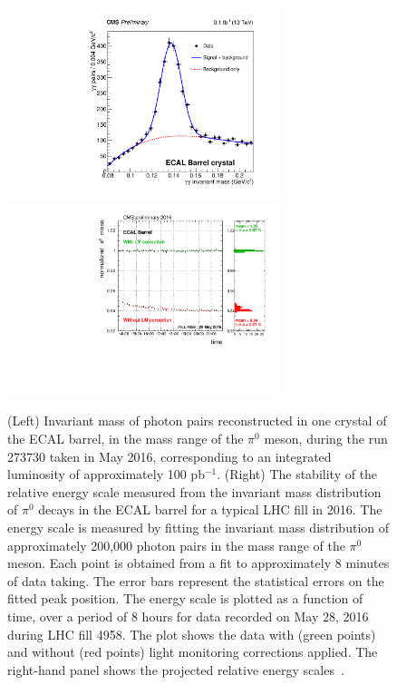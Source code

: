 \begin{figure}[bht]
\begin{center}
\includegraphics[height=5.6cm]{figs/cms/Fit_EB_cry.pdf}
\includegraphics[height=5.6cm]{figs/cms/pi0_EB_plus_1.pdf}
\end{center}
\caption{\label{fig:etaEB}
 (Left) Invariant mass of photon
pairs reconstructed in one crystal of the ECAL barrel, in
the mass range of the $\pi^0$ meson, during the run 273730 taken in May 2016,
corresponding to an integrated luminosity of approximately 100
pb$^{-1}$. (Right) The stability of the relative energy scale measured from the invariant mass distribution of
$\pi^0$ decays in the ECAL barrel for a typical LHC fill in 2016. The energy scale is measured by fitting
the invariant mass distribution of approximately 200,000 photon pairs
in the mass range of the $\pi^0$ meson. Each point is obtained from a fit
to approximately 8 minutes of data taking. The error bars represent
the statistical errors on the fitted peak position. The energy scale
is plotted as a function of time, over a period of 8 hours for data recorded on May 28, 2016 during LHC fill 4958. The
plot shows the data with (green points) and without (red points) light
monitoring corrections applied. The right-hand panel shows the
projected relative energy scales~\cite{CMS-DP-2016-031}.
}
\end{figure}

